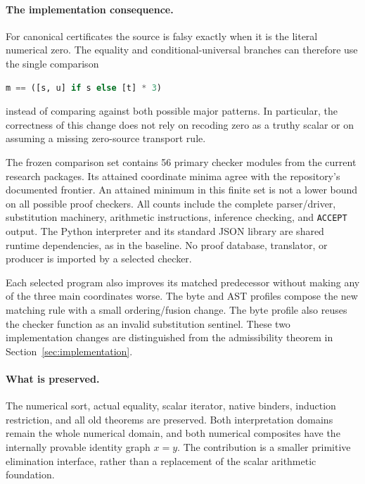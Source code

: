 \documentclass[11pt]{article}
\theoremstyle{definition}\newtheorem{definition}[theorem]{Definition}
\theoremstyle{remark}\newtheorem{remark}[theorem]{Remark}
\newcommand{\file}[1]{\texttt{#1}}
\begin{document}
\paragraph{The implementation consequence.}
For canonical certificates the source is falsy exactly when it is the
literal numerical zero. The equality and conditional-universal branches can
therefore use the single comparison
\begin{lstlisting}[language=Python]
m == ([s, u] if s else [t] * 3)
\end{lstlisting}
instead of comparing against both possible major patterns. In particular,
the correctness of this change does not rely on recoding zero as a truthy
scalar or on assuming a missing zero-source transport rule.



The frozen comparison set contains 56 primary checker modules from the
current research packages. Its attained coordinate minima agree with the
repository's documented frontier. An attained minimum in this finite set is
not a lower bound on all possible proof checkers. All counts include the
complete parser/driver, substitution machinery, arithmetic instructions,
inference checking, and \file{ACCEPT} output. The Python interpreter and its
standard JSON library are shared runtime dependencies, as in the baseline.
No proof database, translator, or producer is imported by a selected checker.

Each selected program also improves its matched predecessor without making
any of the three main coordinates worse. The byte and AST profiles compose
the new matching rule with a small ordering/fusion change. The byte profile
also reuses the checker function as an invalid substitution sentinel. These
two implementation changes are distinguished from the admissibility theorem
in Section~\ref{sec:implementation}.

\paragraph{What is preserved.}
The numerical sort, actual equality, scalar iterator, native binders,
induction restriction, and all old theorems are preserved. Both interpretation
domains remain the whole numerical domain, and both numerical composites have
the internally provable identity graph $x=y$. The contribution is a smaller
primitive elimination interface, rather than a replacement of the scalar
arithmetic foundation.
\end{document}
